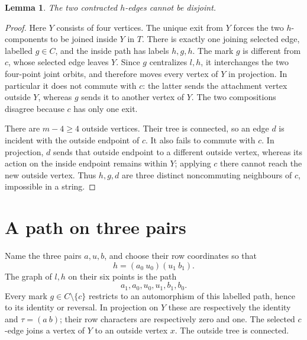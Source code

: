 \documentclass[11pt,a4paper]{article}
\newtheorem{lemma}{Lemma}
\begin{document}
\begin{lemma}\label{disjoint}
The two contracted $h$-edges cannot be disjoint.
\end{lemma}
\begin{proof}
Here $Y$ consists of four vertices. The unique exit from $Y$
forces the two $h$-components to be joined inside $Y$ in $T$.
There is exactly one joining selected edge, labelled $g\in C$,
and the inside path has labels $h,g,h$. The mark $g$ is different
from $c$, whose selected edge leaves $Y$. Since $g$ centralizes
$l,h$, it interchanges the two four-point joint orbits, and
therefore moves every vertex of $Y$ in projection. In particular
it does not commute with $c$: the latter sends the attachment
vertex outside $Y$, whereas $g$ sends it to another vertex of $Y$.
The two compositions disagree because $c$ has only one exit.

There are $m-4\ge4$ outside vertices. Their tree is connected,
so an edge $d$ is incident with the outside endpoint of $c$.
It also fails to commute with $c$. In projection, $d$ sends that
outside endpoint to a different outside vertex, whereas its action
on the inside endpoint remains within $Y$; applying $c$ there
cannot reach the new outside vertex. Thus $h,g,d$ are three
distinct noncommuting neighbours of $c$, impossible in a string.
\end{proof}

\section*{A path on three pairs}
Name the three pairs $a,u,b$, and choose their row coordinates so
that
\[
                   h=(a_0\ u_0)(u_1\ b_1).            \tag{2}
\]
The graph of $l,h$ on their six points is the path
\[
                 a_1,a_0,u_0,u_1,b_1,b_0.
\]
Every mark $g\in C\setminus\{c\}$ restricts to an automorphism
of this labelled path, hence to its identity or reversal.
In projection on $Y$ these are respectively the identity and
$\tau=(a\ b)$; their row characters are respectively zero and one.
The selected $c$-edge joins a vertex of $Y$ to an outside vertex
$x$. The outside tree is connected.
\end{document}

